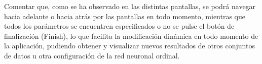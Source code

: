 		Comentar que, como se ha observado en las distintas pantallas, se podrá navegar hacia adelante o hacia atrás por las pantallas en todo momento, mientras que todos los parámetros se encuentren especificados o no se pulse el botón de finalización (Finish), lo que facilita la modificación dinámica en todo momento de la aplicación, pudiendo obtener y visualizar nuevos resultados de otros conjuntos de datos u otra configuración de la red neuronal ordinal.

